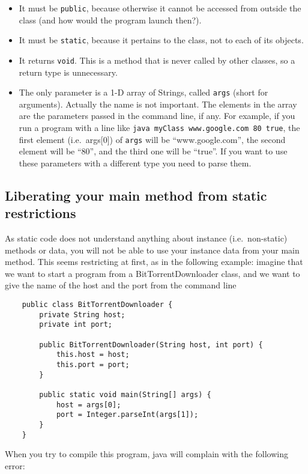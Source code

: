 \begin{itemize}
\item It must be \verb+public+, because otherwise it cannot be
  accessed from outside the class (and how would the program launch
  then?).
\item It must be \verb+static+, because it pertains to the class, not
  to each of its objects.
\item It returns \verb+void+. This is a method that is never called by
  other classes, so a return type is unnecessary.
\item The only parameter is a 1-D array of Strings, called \verb+args+
  (short for arguments). Actually the name is not important. The
  elements in the array are the parameters passed in the command line,
  if any. For example, if you run a program with a line like
  \verb+java myClass www.google.com 80 true+, the first element
  (i.e.~args[0]) of \verb+args+ will be ``www.google.com'', the second
  element will be ``80'', and the third one will be ``true''. If you
  want to use these parameters with a different type you need to parse
  them. 
\end{itemize}

\subsection{Liberating your main method from static restrictions}
\label{sec:liber-your-launch}

As static code does not understand anything about instance
(i.e.~non-static) methods or data, you will not be able to use your
instance data from your main method. This seems restricting at first,
as in the following example: imagine that we want to start a program
from a BitTorrentDownloader class, and we want to give the name of the
host and the port from the command line

\begin{verbatim}
    public class BitTorrentDownloader {
        private String host;
        private int port;
    
        public BitTorrentDownloader(String host, int port) {
            this.host = host;
            this.port = port;
        }
    
        public static void main(String[] args) {
            host = args[0];
            port = Integer.parseInt(args[1]);
        }
    }
\end{verbatim}

When you try to compile this program, java will complain with the
following error: 

